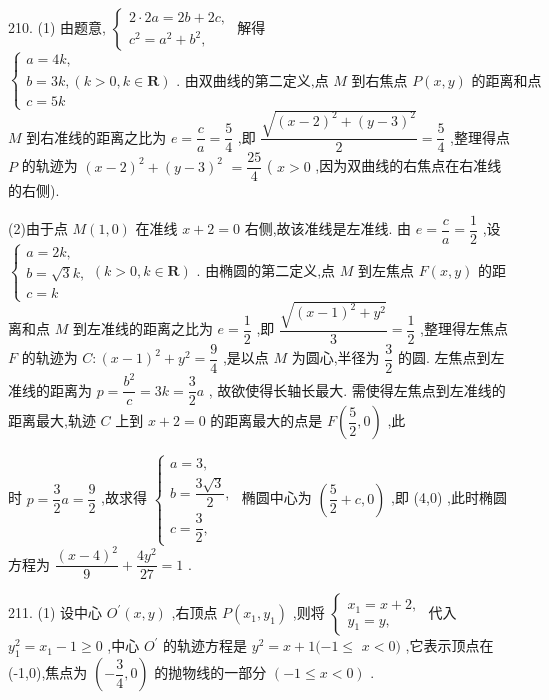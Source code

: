 210. (1) 由题意, $\left\{  \begin{array}{l} 2 \cdot  {2a} = {2b} + {2c}, \\  {c}^{2} = {a}^{2} + {b}^{2}, \end{array}\right.$ 解得 $\left\{  \begin{array}{l} a = {4k}, \\  b = {3k},\left( {k > 0,k \in  \mathbf{R}}\right) \text{ . 由双曲线的第二定义,点 }M\text{ 到右焦点 }P\left( {x,y}\right) \text{ 的距离和点 } \\  c = {5k} \end{array}\right.$  $M$ 到右准线的距离之比为 $e = \dfrac{c}{a} = \dfrac{5}{4}$ ,即 $\dfrac{\sqrt{{\left( x - 2\right) }^{2} + {\left( y - 3\right) }^{2}}}{2} = \dfrac{5}{4}$ ,整理得点 $P$ 的轨迹为 ${\left( x - 2\right) }^{2} + {\left( y - 3\right) }^{2}$  $= \dfrac{25}{4}$ ( $x > 0$ ,因为双曲线的右焦点在右准线的右侧).

(2)由于点 $M\left( {1,0}\right)$ 在准线 $x + 2 = 0$ 右侧,故该准线是左准线. 由 $e = \dfrac{c}{a} = \dfrac{1}{2}$ ,设 $\left\{  {\begin{array}{l} a = {2k}, \\  b = \sqrt{3}k, \\  c = k \end{array}\left( {k > 0,k \in  \mathbf{R}}\right) }\right.$ . 由椭圆的第二定义,点 $M$ 到左焦点 $F\left( {x,y}\right)$ 的距离和点 $M$ 到左准线的距离之比为 $e = \dfrac{1}{2}$ ,即 $\dfrac{\sqrt{{\left( x - 1\right) }^{2} + {y}^{2}}}{3} = \dfrac{1}{2}$ ,整理得左焦点 $F$ 的轨迹为 $C : {\left( x - 1\right) }^{2} + {y}^{2} = \dfrac{9}{4}$ ,是以点 $M$ 为圆心,半径为 $\dfrac{3}{2}$ 的圆. 左焦点到左准线的距离为 $p = \dfrac{{b}^{2}}{c} = {3k} = \dfrac{3}{2}a$ , 故欲使得长轴长最大. 需使得左焦点到左准线的距离最大,轨迹 $C$ 上到 $x + 2 = 0$ 的距离最大的点是 $F\left( {\dfrac{5}{2},0}\right)$ ,此

时 $p = \dfrac{3}{2}a = \dfrac{9}{2}$ ,故求得 $\left\{  \begin{array}{l} a = 3, \\  b = \dfrac{3\sqrt{3}}{2}, \\  c = \dfrac{3}{2}, \end{array}\right.$ 椭圆中心为 $\left( {\dfrac{5}{2} + c,0}\right)$ ,即 (4,0) ,此时椭圆方程为 $\dfrac{{\left( x - 4\right) }^{2}}{9} + \dfrac{4{y}^{2}}{27} = 1$ .

211. (1) 设中心 ${O}^{\prime }\left( {x,y}\right)$ ,右顶点 $P\left( {{x}_{1},{y}_{1}}\right)$ ,则将 $\left\{  \begin{array}{l} {x}_{1} = x + 2, \\  {y}_{1} = y, \end{array}\right.$ 代入 ${y}_{1}^{2} = {x}_{1} - 1 \geq  0$ ,中心 ${O}^{\prime }$ 的轨迹方程是 ${y}^{2} = x + 1( - 1 \leq$  $x < 0)$ ,它表示顶点在(-1,0),焦点为 $\left( {-\dfrac{3}{4},0}\right)$ 的抛物线的一部分 $\left( {-1 \leq  x < 0}\right)$ .

